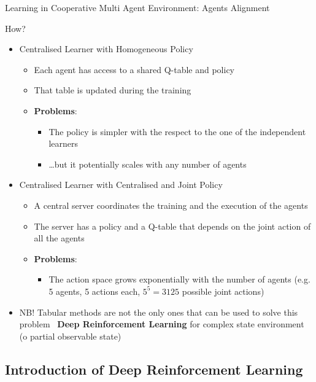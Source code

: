 \documentclass[presentation, 8pt]{beamer}\mode<presentation>{\usetheme{AMSBolognaFC}}
\begin{document}
\begin{frame}[allowframebreaks]{Learning in Cooperative Multi Agent Environment: Agents Alignment}
\begin{alertblock}{How?}
\begin{itemize}
\begin{itemize}
\begin{itemize}
				\item It hardly scales with the number of agent
			\end{itemize}
		\end{itemize}
		\item Centralised Learner with Homogeneous Policy
		\begin{itemize}
			\item Each agent has access to a shared Q-table and policy
			\item That table is updated during the training
			\item \textbf{Problems}:
			\begin{itemize}
				\item The policy is simpler with the respect to the one of the independent learners
				\item \dots but it potentially scales with any number of agents
			\end{itemize}
		\end{itemize}
		\item Centralised Learner with Centralised and Joint Policy
		\begin{itemize}
			\item A central server coordinates the training and the execution of the agents
			\item The server has a policy and a Q-table that depends on the joint action of all the agents
			\item \textbf{Problems}:
			\begin{itemize}
				\item The action space grows exponentially with the number of agents (e.g. 5 agents, 5 actions each, $5^5=3125$ possible joint actions)
			\end{itemize}
		\end{itemize}
		\item NB! Tabular methods are not the only ones that can be used to solve this problem \faArrowRight \, \textbf{Deep Reinforcement Learning} for complex state environment (o partial observable state)
	\end{itemize}
\end{alertblock}
\end{frame}
\subsection{Introduction of Deep Reinforcement Learning}
\end{document}
